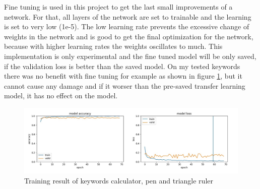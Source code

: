 \documentclass[../ImageClassifier.tex]{subfiles}
\begin{document}
    Fine tuning is used in this project to get the last small improvements of a network.
    For that, all layers of the network are set to trainable and the learning is set to very low (1e-5).
    The low learning rate prevents the excessive change of weights in the network and is good to get the final optimization for the network, because with higher learning rates the weights oscillates to much.
    This implementation is only experimental and the fine tuned model will be only saved, if the validation loss is better than the saved model.
    On my tested keywords there was no benefit with fine tuning for example as shown in figure \ref{fig:training result calculator,pen,triangle ruler}, but it cannot cause any damage and if it worser than the pre-saved transfer learning model, it has no effect on the model.
    \begin{figure}[ht!]
        \centering
        \includegraphics[width=1\linewidth]{./attachments/fine tuning/calculator,pen,triangle ruler.jpg}
        \caption{Training result of keywords calculator, pen and triangle ruler}
        \label{fig:training result calculator,pen,triangle ruler}
    \end{figure}
\end{document}

